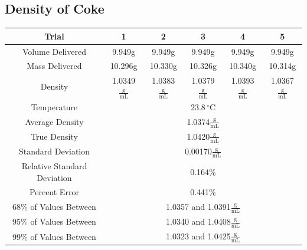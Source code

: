 \documentclass[fleqn,titlepage]{article}
\begin{document}
  \subsection*{Density of Coke}
    \begin{center}
      \begin{tabular}{|c|c|c|c|c|c|}
        \hline
        Trial & 1 & 2 & 3 & 4 & 5 \\
        \hline
        Volume Delivered & 9.949g & 9.949g & 9.949g & 9.949g & 9.949g \\
        Mass Delivered & 10.296g & 10.330g & 10.326g & 10.340g & 10.314g  \\
        Density & 1.0349$\frac{\text{g}}{\text{mL}}$ & 1.0383$\frac{\text{g}}{\text{mL}}$ & 1.0379$\frac{\text{g}}{\text{mL}}$ & 1.0393$\frac{\text{g}}{\text{mL}}$ & 1.0367$\frac{\text{g}}{\text{mL}}$  \\
        \hline
        Temperature & \multicolumn{5}{c|}{$23.8\,^{\circ}\mathrm{C}$} \\
        Average Density & \multicolumn{5}{c|}{1.0374$\frac{\text{g}}{\text{mL}}$} \\
        True Density & \multicolumn{5}{c|}{1.0420$\frac{\text{g}}{\text{mL}}$} \\
        Standard Deviation & \multicolumn{5}{c|}{0.00170$\frac{\text{g}}{\text{mL}}$} \\
        Relative Standard Deviation & \multicolumn{5}{c|}{0.164\%} \\
        Percent Error & \multicolumn{5}{c|}{0.441\%} \\
        68\% of Values Between & \multicolumn{5}{c|}{1.0357 and 1.0391$\frac{\text{g}}{\text{mL}}$} \\
        95\% of Values Between & \multicolumn{5}{c|}{1.0340 and 1.0408$\frac{\text{g}}{\text{mL}}$} \\
        99\% of Values Between & \multicolumn{5}{c|}{1.0323 and 1.0425$\frac{\text{g}}{\text{mL}}$} \\
        \hline
      \end{tabular}
    \end{center}
\end{document}
